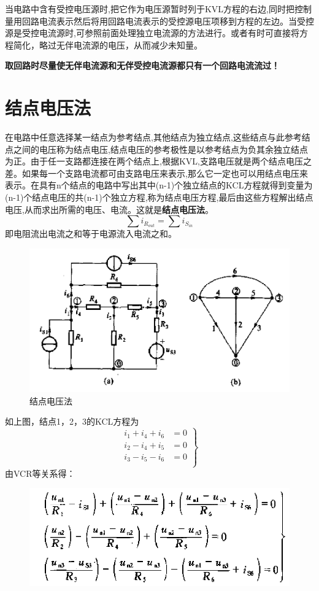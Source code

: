 \documentclass[11pt,a4paper,oneside]{book}
\begin{document}
当电路中含有受控电压源时,把它作为电压源暂时列于KVL方程的右边,同时把控制量用回路电流表示然后将用回路电流表示的受控源电压项移到方程的左边。当受控源是受控电流源时,可参照前面处理独立电流源的方法进行。或者有时可直接将方程简化，略过无伴电流源的电压，从而减少未知量。

\textbf{取回路时尽量使无伴电流源和无伴受控电流源都只有一个回路电流流过！}
\section{结点电压法}
在电路中任意选择某一结点为参考结点,其他结点为独立结点,这些结点与此参考结点之间的电压称为结点电压,结点电压的参考极性是以参考结点为负其余独立结点为正。由于任一支路都连接在两个结点上,根据KVL,支路电压就是两个结点电压之差。如果每一个支路电流都可由支路电压来表示,那么它一定也可以用结点电压来表示。在具有n个结点的电路中写出其中(n-1)个独立结点的KCL方程就得到变量为(n-1)个结点电压的共(n-1)个独立方程,称为结点电压方程,最后由这些方程解出结点电压,从而求出所需的电压、电流。这就是\textbf{结点电压法}。
\begin{equation}
	\sum i_{R_{out}}=\sum i_{S_{in}}
\end{equation}
即电阻流出电流之和等于电源流入电流之和。
\begin{figure}[H]
	\centering
	\includegraphics[width=0.7\linewidth]{screenshot043}
	\caption{结点电压法}
	\label{fig:screenshot043}
\end{figure}
如上图，结点1，2，3的KCL方程为
\begin{equation}
	\left.
	\begin{aligned}
		i_1+i_4+i_6&=0 \\
		i_2-i_4+i_5&=0 \\
		i_3-i_5-i_6&=0 \\
	\end{aligned}
\right\}
\end{equation}
由VCR等关系得：
\begin{figure}[H]
	\centering
	\includegraphics[width=0.6\linewidth]{screenshot044}
	\caption{}
	\label{fig:screenshot044}
\end{figure}
\end{document}
